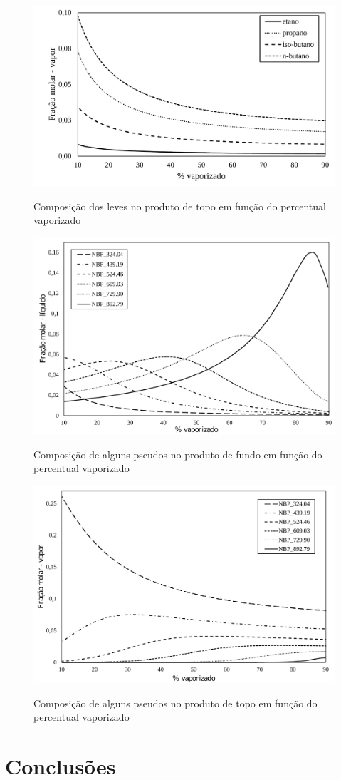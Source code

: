 \begin{figure}[htb]
\centering
{\includegraphics[width=1.0\textwidth]{img/trab3vap.pdf}} 
\caption{Composição dos leves no produto de topo em função do percentual
vaporizado}
\label{fig:vap}
\end{figure}

\begin{figure}[htb] 
\centering
{\includegraphics[width=1.0\textwidth]{img/trab3liqall.pdf}} 
\caption{Composição de alguns pseudos no produto de fundo em função do
percentual vaporizado}
\label{fig:liqall}
\end{figure}

\begin{figure}[htb]
\centering
{\includegraphics[width=1.0\textwidth]{img/trab3vapall.pdf}} 
\caption{Composição de alguns pseudos no produto de topo em função do
percentual vaporizado}
\label{fig:vapall}
\end{figure}

\clearpage
\section{Conclusões} 


